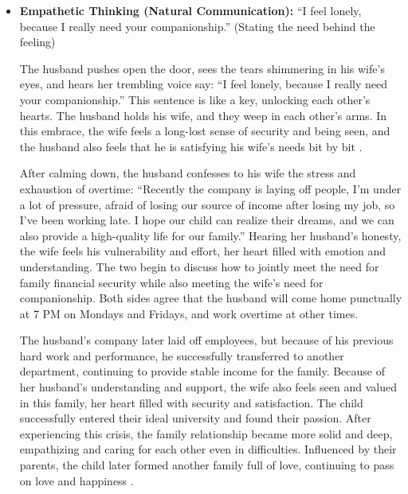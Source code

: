 \begin{itemize}
    If the husband chooses to attack inward, he might choose jackal silence,
    or silently blame himself: ``Why am I so useless? I can't even support a
    family, and I get scolded like this by my wife? I really am a failure!''
    Physically and mentally exhausted, frustrated inside and out, he chooses
    to escape this relationship, leaving this home forever, and eventually
    sinks into illness and bad habits.
    The wife also feels deeper loneliness and despair due to his departure,
    developing psychological illnesses.
    The child, unable to go to school due to lack of money, blames the
    family's incompetence and heartlessness, eventually turning to crime \citep{levine1997}.

    \item \textbf{Empathetic Thinking (Natural Communication):}
    ``I feel lonely, because I really need your companionship.''
    (Stating the need behind the feeling)

    The husband pushes open the door, sees the tears shimmering in his wife's
    eyes, and hears her trembling voice say: ``I feel lonely, because I really
    need your companionship.''
    This sentence is like a key, unlocking each other's hearts.
    The husband holds his wife, and they weep in each other's arms. In this
    embrace, the wife feels a long-lost sense of security and being seen, and
    the husband also feels that he is satisfying his wife's needs bit by bit \citep{porges2011}.

    After calming down, the husband confesses to his wife the stress and
    exhaustion of overtime: ``Recently the company is laying off people, I'm
    under a lot of pressure, afraid of losing our source of income after
    losing my job, so I've been working late. I hope our child can realize
    their dreams, and we can also provide a high-quality life for our family.''
    Hearing her husband's honesty, the wife feels his vulnerability and effort,
    her heart filled with emotion and understanding.
    The two begin to discuss how to jointly meet the need for family financial
    security while also meeting the wife's need for companionship.
    Both sides agree that the husband will come home punctually at 7 PM on
    Mondays and Fridays, and work overtime at other times.

    The husband's company later laid off employees, but because of his
    previous hard work and performance, he successfully transferred to another
    department, continuing to provide stable income for the family.
    Because of her husband's understanding and support, the wife also feels
    seen and valued in this family, her heart filled with security and
    satisfaction.
    The child successfully entered their ideal university and found their
    passion.
    After experiencing this crisis, the family relationship became more solid
    and deep, empathizing and caring for each other even in difficulties.
    Influenced by their parents, the child later formed another family full
    of love, continuing to pass on love and happiness \citep{siegel2003}.
\end{itemize}

